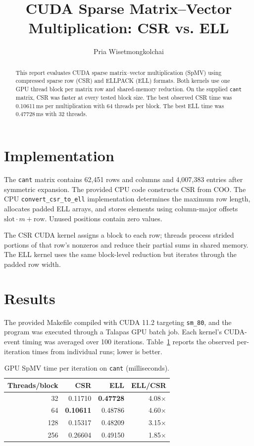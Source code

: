 \documentclass[sigconf,nonacm]{acmart}
\title{CUDA Sparse Matrix--Vector Multiplication: CSR vs. ELL}
\author{Pria Wisetmongkolchai}
\begin{document}
\begin{abstract}
This report evaluates CUDA sparse matrix--vector multiplication (SpMV) using compressed sparse row (CSR) and ELLPACK (ELL) formats. Both kernels use one GPU thread block per matrix row and shared-memory reduction. On the supplied \texttt{cant} matrix, CSR was faster at every tested block size. The best observed CSR time was 0.10611\,ms per multiplication with 64 threads per block. The best ELL time was 0.47728\,ms with 32 threads.
\end{abstract}
\maketitle
\section{Implementation}
The \texttt{cant} matrix contains 62,451 rows and columns and 4,007,383 entries after symmetric expansion. The provided CPU code constructs CSR from COO. The CPU \texttt{convert\_csr\_to\_ell} implementation determines the maximum row length, allocates padded ELL arrays, and stores elements using column-major offsets $\mathrm{slot}\cdot m+\mathrm{row}$. Unused positions contain zero values.

The CSR CUDA kernel assigns a block to each row; threads process strided portions of that row's nonzeros and reduce their partial sums in shared memory. The ELL kernel uses the same block-level reduction but iterates through the padded row width.

\section{Results}
The provided Makefile compiled with CUDA 11.2 targeting \texttt{sm\_80}, and the program was executed through a Talapas GPU batch job. Each kernel's CUDA-event timing was averaged over 100 iterations. Table~\ref{tab:results} reports the observed per-iteration times from individual runs; lower is better.

\begin{table}[t]
\caption{GPU SpMV time per iteration on \texttt{cant} (milliseconds).}
\label{tab:results}
\centering
\small
\begin{tabular}{@{}r r r r@{}}
\toprule
Threads/block & CSR & ELL & ELL/CSR \\
\midrule
32  & 0.11710 & \textbf{0.47728} & 4.08$\times$ \\
64  & \textbf{0.10611} & 0.48786 & 4.60$\times$ \\
128 & 0.15317 & 0.48209 & 3.15$\times$ \\
256 & 0.26604 & 0.49150 & 1.85$\times$ \\
\bottomrule
\end{tabular}
\end{table}
\end{document}
